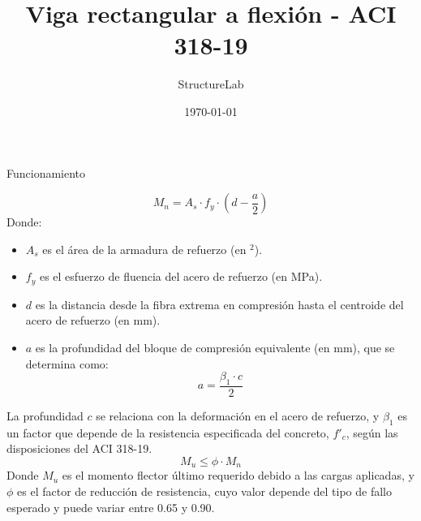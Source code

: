 \documentclass[a4paper,spanish,10pt]{article}%
\title{Viga rectangular a flexión {-} ACI 318{-}19}%
\author{StructureLab}%
\date{\today}%
\begin{document}
%
\normalsize%
\maketitle%
Funcionamiento%

        \begin{equation}
        M_n = A_s \cdot f_y \cdot \left( d - \frac{a}{2} \right)
        \end{equation}
        Donde:
        \begin{itemize}
            \item $A_s$ es el área de la armadura de refuerzo (en $^2$).
            \item $f_y$ es el esfuerzo de fluencia del acero de refuerzo (en MPa).
            \item $d$ es la distancia desde la fibra extrema en compresión hasta el centroide del acero de refuerzo (en mm).
            \item $a$ es la profundidad del bloque de compresión equivalente (en mm), que se determina como:
            \begin{equation}
            a = \frac{\beta_1 \cdot c}{2}
            \end{equation}
        \end{itemize}

        La profundidad $c$ se relaciona con la deformación en el acero de refuerzo, y $\beta_1$ es un factor que depende de la resistencia especificada del concreto, $f'_c$, según las disposiciones del ACI 318-19.
        \begin{equation}
        M_u \leq \phi \cdot M_n
        \end{equation}
        Donde $M_u$ es el momento flector último requerido debido a las cargas aplicadas, y $\phi$ es el factor de reducción de resistencia, cuyo valor depende del tipo de fallo esperado y puede variar entre 0.65 y 0.90.
\end{document}
